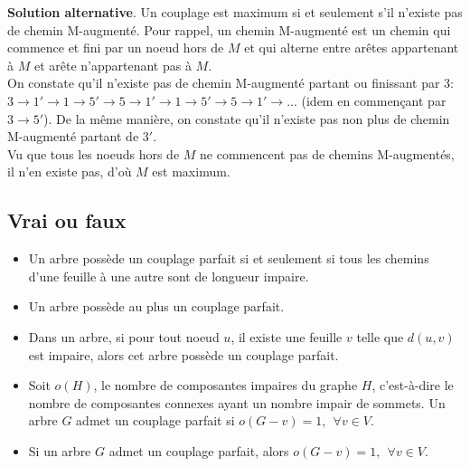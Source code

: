 \begin{solution}
	\textbf{Solution alternative}.
	Un couplage est maximum si et seulement s’il n'existe pas de chemin M-augmenté. Pour rappel, un chemin M-augmenté est un chemin qui commence et fini par un noeud hors de $M$ et qui alterne entre arêtes appartenant à $M$ et arête n'appartenant pas à $M$.\\
	
	On constate qu'il n'existe pas de chemin M-augmenté partant ou finissant par $3$: $3\rightarrow 1'\rightarrow 1\rightarrow 5'\rightarrow 5\rightarrow 1'\rightarrow 1\rightarrow 5'\rightarrow 5\rightarrow 1'\rightarrow ...$ (idem en commençant par $3\rightarrow 5'$).
	De la même manière, on constate qu'il n'existe pas non plus de chemin M-augmenté partant de $3'$.\\
	
	Vu que tous les noeuds hors de $M$ ne commencent pas de chemins M-augmentés, il n'en existe pas, d'où $M$ est maximum.
\end{solution}

\subsection{Vrai ou faux}
\begin{itemize}
  \item Un arbre possède un couplage parfait si et seulement si tous les chemins d'une feuille à une autre sont de longueur impaire.
  \item Un arbre possède au plus un couplage parfait.
  \item Dans un arbre, si pour tout noeud $u$, il existe une feuille $v$ telle que $d(u,v)$ est impaire, alors cet arbre possède un couplage parfait.
  \item Soit $o(H)$, le nombre de composantes impaires du graphe $H$, c'est-à-dire le nombre de composantes connexes ayant un nombre impair de sommets. Un arbre $G$ admet un couplage parfait si $o(G-v)=1,  \ \ \forall v \in V$.
  \item Si un arbre $G$ admet un couplage parfait, alors $o(G-v)=1, \ \ \forall v \in V$.
\end{itemize}

